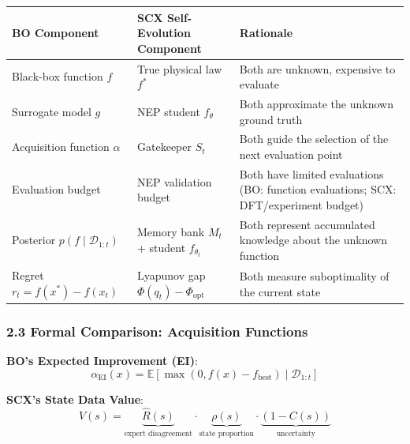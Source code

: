 \documentclass[
  12pt,
]{article}
\begin{document}
\begin{longtable}[]{@{}
  >{\raggedright\arraybackslash}p{}
  >{\raggedright\arraybackslash}p{}
  >{\raggedright\arraybackslash}p{}@{}}
\toprule\noalign{}
\begin{minipage}[b]{\linewidth}\raggedright
BO Component
\end{minipage} & \begin{minipage}[b]{\linewidth}\raggedright
SCX Self-Evolution Component
\end{minipage} & \begin{minipage}[b]{\linewidth}\raggedright
Rationale
\end{minipage} \\
\midrule\noalign{}
\endhead
\bottomrule\noalign{}
\endlastfoot
Black-box function \(f\) & True physical law \(f^*\) & Both are unknown,
expensive to evaluate \\
Surrogate model \(g\) & NEP student \(f_\theta\) & Both approximate the
unknown ground truth \\
Acquisition function \(\alpha\) & Gatekeeper \(S_t\) & Both guide the
selection of the next evaluation point \\
Evaluation budget & NEP validation budget & Both have limited
evaluations (BO: function evaluations; SCX: DFT/experiment budget) \\
Posterior \(p(f \mid \mathcal{D}_{1:t})\) & Memory bank \(M_t\) +
student \(f_{\theta_t}\) & Both represent accumulated knowledge about
the unknown function \\
Regret \(r_t = f(x^*) - f(x_t)\) & Lyapunov gap
\(\Phi(q_t) - \Phi_{\text{opt}}\) & Both measure suboptimality of the
current state \\
\end{longtable}

\subsubsection{2.3 Formal Comparison: Acquisition
Functions}\label{formal-comparison-acquisition-functions}

\textbf{BO's Expected Improvement (EI)}:
\[\alpha_{\text{EI}}(x) = \mathbb{E}\left[\max(0, f(x) - f_{\text{best}}) \mid \mathcal{D}_{1:t}\right]\]

\textbf{SCX's State Data Value}:
\[V(s) = \underbrace{\hat{R}(s)}_{\text{expert disagreement}} \cdot \underbrace{\rho(s)}_{\text{state proportion}} \cdot \underbrace{(1 - C(s))}_{\text{uncertainty}}\]
\end{document}
